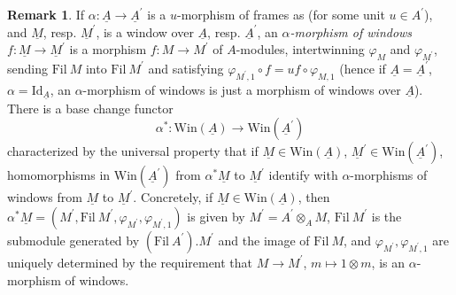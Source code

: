 \documentclass{amsart}
\theoremstyle{plain}
\theoremstyle{definition}
\newtheorem{remark}[theorem]{Remark}
\newcommand{\Fil}{\mathrm{Fil}}
\newcommand{\Win}{\mathrm{Win}}
\newcommand{\red}[1]{{\color{black} #1}}
\begin{document}
\red{	
\begin{remark}
\label{alpha-morphisms-and-base-change}
If $\alpha : \underline{A} \to \underline{A}^\prime$ is a $u$-morphism of frames as \Cref{frame} (for some unit $u\in A^\prime$), and $\underline{M}$, resp. $\underline{M}^\prime$, is a window over $\underline{A}$, resp. $\underline{A}^\prime$, an \textit{$\alpha$-morphism of windows} $f: \underline{M} \to \underline{M}^\prime$ is a morphism $f: M\to M^\prime$ of $A$-modules, intertwinning $\varphi_M$ and $\varphi_{M^\prime}$, sending $\Fil~ M$ into $\Fil ~ M^\prime$ and satisfying $\varphi_{M^\prime,1} \circ f = u f \circ \varphi_{M,1}$ (hence if $\underline{A}=\underline{A}^\prime$, $\alpha=\mathrm{Id}_{\underline{A}}$, an $\alpha$-morphism of windows is just a morphism of windows over $\underline{A}$). There is a base change functor 
$$
\alpha^\ast : \Win(\underline{A}) \to \Win(\underline{A}^\prime)
$$ characterized by the universal property that if $\underline{M}\in \Win(\underline{A})$, $\underline{M}^\prime \in \Win(\underline{A}^\prime)$, homomorphisms in $\Win(\underline{A}^\prime)$ from $\alpha^\ast \underline{M}$ to $\underline{M}^\prime$ identify with $\alpha$-morphisms of windows from $\underline{M}$ to $\underline{M}^\prime$. Concretely, if  $\underline{M}\in \Win(\underline{A})$, then $\alpha^\ast \underline{M}=(M^\prime, \Fil ~ M^\prime, \varphi_{M^\prime}, \varphi_{M^\prime, 1})$ is given by $M^\prime = A^\prime \otimes_A M$, $\Fil ~ M^\prime$ is the submodule generated by $(\Fil~ A^\prime).M^\prime$ and the image of $\Fil~ M$, and $\varphi_{M^\prime}, \varphi_{M^\prime,1}$ are uniquely determined by the requirement that $M \to M^\prime$, $m \mapsto 1 \otimes m$, is an $\alpha$-morphism of windows.
\end{remark}	
}	
\end{document}
